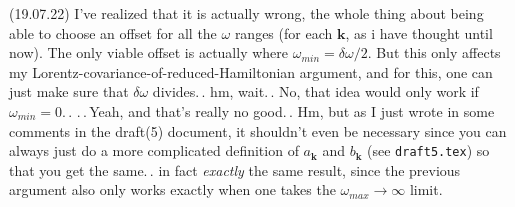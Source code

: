 \documentclass{report}
\begin{document}
(19.07.22) I've realized that it is actually wrong, the whole thing about being able to choose an offset for all the $\omega$ ranges (for each $\mathbf{k}$, as i have thought until now). The only viable offset is actually where $\omega_{min} = \delta\omega/2$. But this only affects my Lorentz-covariance-of-reduced-Hamiltonian argument, and for this, one can just make sure that $\delta\omega$ divides.\,. hm, wait.\,. No, that idea would only work if $\omega_{min} = 0$.\,. .\,.\,Yeah, and that's really no good.\,. Hm, but as I just wrote in some comments in the draft(5) document, it shouldn't even be necessary since you can always just do a more complicated definition of $a_{\mathbf{k}}$ and $b_{\mathbf{k}}$ (see \texttt{draft5.tex}) so that you get the same.\,. in fact \emph{exactly} the same result, since the previous argument also only works exactly when one takes the $\omega_{max}\to\infty$ limit. 
\end{document}
